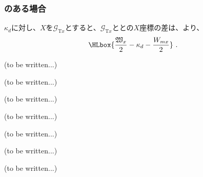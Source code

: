 \clearpage
\subsubsection{\Outcut のある場合}
\AsideKeywayDepth$\kappa_d$に対し、\TopOutcutCenter$X$を$\mathcal G_{\mathrm Tx}$とすると、$\mathcal G_{\mathrm Tx}$と\KeywayCenter との$X$座標の差は、より、
\begin{align*}
  \HLbox{\frac{\mathfrak W_x}2-\kappa_d-\frac{W_{mx}}2}\ .
\end{align*}



\clearpage
(to be written...)



(to be written...)



(to be written...)



(to be written...)


(to be written...)


(to be written...)



\clearpage
(to be written...)
